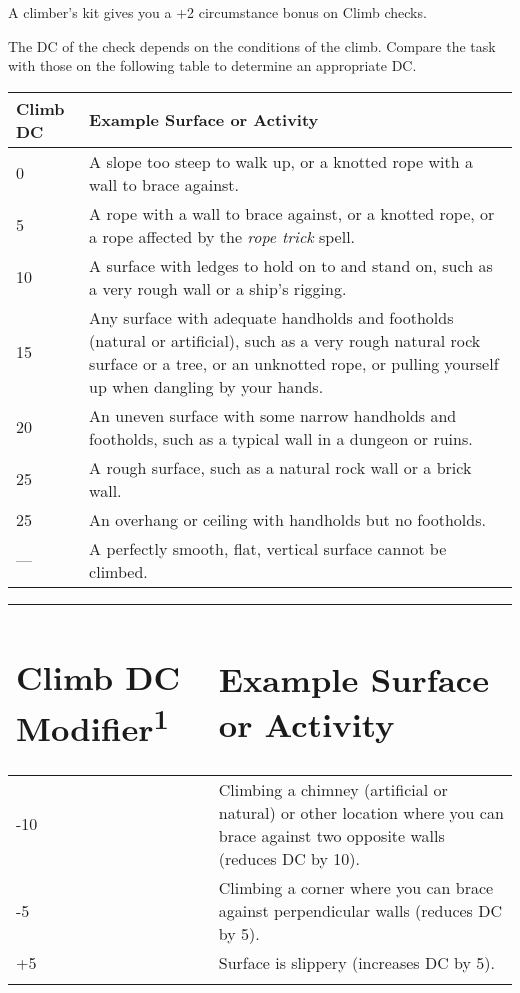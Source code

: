\documentclass{article}
\begin{document}
A climber's kit gives you a +2 circumstance bonus on Climb checks.

The DC of the check depends on the conditions of the climb. Compare the task with 
those on the following table to determine an appropriate DC.

\vspace{12pt}
\begin{tabular}{|>{\raggedright}p{18pt}|>{\raggedright}p{307pt}|}
\hline
C\textbf{limb DC } & E\textbf{xample Surface or Activity}\tabularnewline
\hline
0  & A slope too steep to walk up, or a knotted rope with a wall to brace against.\tabularnewline
\hline
5  & A rope with a wall to brace against, or a knotted rope, or a rope affected 
by the \textit{rope trick }spell. \tabularnewline
\hline
10  & A surface with ledges to hold on to and stand on, such as a very rough wall 
or a ship's rigging. \tabularnewline
\hline
15  & Any surface with adequate handholds and footholds (natural or artificial), 
such as a very rough natural rock surface or a tree, or an unknotted rope, or pulling 
yourself up when dangling by your hands. \tabularnewline
\hline
20  & An uneven surface with some narrow handholds and footholds, such as a typical 
wall in a dungeon or ruins. \tabularnewline
\hline
25  & A rough surface, such as a natural rock wall or a brick wall. \tabularnewline
\hline
25  & An overhang or ceiling with handholds but no footholds. \tabularnewline
\hline
---  & A perfectly smooth, flat, vertical surface cannot be climbed.\tabularnewline
\hline
\end{tabular}

\vspace{12pt}
\begin{tabular}{|>{\raggedright}p{52pt}|>{\raggedright}p{274pt}|}
\hline
\section*{C\textbf{limb DC Modifier}\textsuperscript{\textbf{1}}\textbf{ }} & \section*{E\textbf{xample 
Surface or Activity}}\tabularnewline
\hline
-10 &  Climbing a chimney (artificial or natural) or other location where you can 
brace against two opposite walls (reduces DC by 10).\tabularnewline
\hline
-5  & Climbing a corner where you can brace against perpendicular walls (reduces 
DC by 5).\tabularnewline
\hline
+5 &  Surface is slippery (increases DC by 5).\tabularnewline
\hline
\multicolumn{2}{|p{326pt}|}{1These modifiers are cumulative; use any that apply.}\tabularnewline
\hline
\end{tabular}
\end{document}
